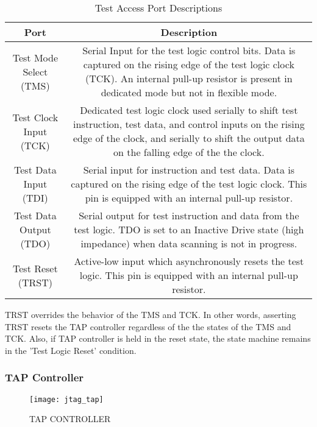 \documentclass[a4paper,11pt]{article}
\begin{document}
\begin{center}
\begin{table}[!h]
\caption{Test Access Port Descriptions\cite{microsemi}}
\label{table:tap}
\begin{tabular}{|c|c|}
 \hline
 \textbf{Port} & \textbf{Description} \\ \hline
 Test Mode Select (TMS) & \multicolumn{1}{m{11cm}|}{Serial Input  for the test logic control bits. Data is captured on the rising edge of the test logic clock (TCK). An internal pull-up resistor is present in dedicated mode but not in flexible mode. }\\\hline
 Test Clock Input (TCK) & \multicolumn{1}{m{11cm}|}{Dedicated test logic clock used serially to shift test instruction, test data, and control inputs on the rising edge of the clock, and serially to shift the output data on the falling edge of the the clock.}\\\hline
Test Data Input (TDI) & \multicolumn{1}{m{11cm}|}{Serial input for instruction and test data. Data is captured on the rising edge of the test logic clock. This pin is equipped with an internal pull-up resistor.}\\\hline
Test Data Output (TDO) & \multicolumn{1}{m{11cm}|}{Serial output for test instruction and data from the test logic. TDO is set to an Inactive Drive state (high impedance) when data scanning is not in progress.}\\\hline
Test Reset (TRST) & \multicolumn{1}{m{11cm}|}{Active-low input which asynchronously resets the test logic. This pin is equipped with an internal pull-up resistor.}\\\hline
\end{tabular}
\end{table}
\end{center}

\FloatBarrier
TRST overrides the behavior of the TMS and TCK. In other words, asserting TRST resets the TAP controller regardless of the the states of the TMS and TCK. Also, if TAP controller is held in the reset state, the state machine remains in the 'Test Logic Reset' condition.\cite{microsemi}

\subsubsection{TAP Controller}

\begin{figure}[ht]
\centering
\texttt{[image: jtag\_tap]}
\label{jtag_tap}
\caption{TAP CONTROLLER \cite{fpga4fun}}
\end{figure}
\end{document}
